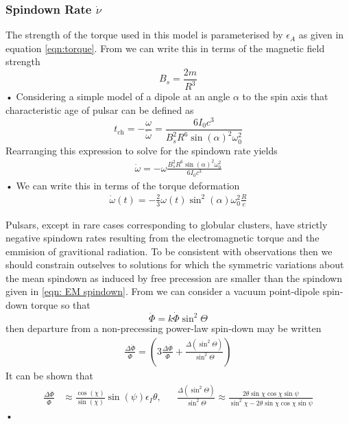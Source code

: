 \documentclass[/home/greg/Thesis/main/main.tex]{subfiles}
\begin{document}
\FloatBarrier
\subsubsection{Spindown Rate $\dot{\nu}$}
The strength of the torque used in this model is parameterised by $\epsilon_{A}$ as given
in equation \eqref{eqn:torque}. From \citet{Shapiro83} we can write this in terms of the
magnetic field strength 
\begin{equation}
B_{s} = \frac{2m}{R^{3}}
\end{equation}•
Considering a simple model of a dipole at an angle $\alpha$ to the spin axis that characteristic
age of pulsar can be defined as
\begin{equation}
t_{\textrm{ch}} = -\frac{\omega}{\dot{\omega}} = \frac{6 I_{0} c^{3}}{B_{s}^{2}R^{6} \sin(\alpha)^{2}\omega_{0}^{2}}
\end{equation}
Rearranging this expression to solve for the spindown rate yields
\begin{align}
\dot\omega = - \omega \frac{B_{s}^{2}R^{6} \sin(\alpha)^{2}\omega_{0}^{2}}{6I_{0}c^{3}}
\end{align}•
We can write this in terms of the torque deformation
\begin{align}
\dot\omega(t) = - \frac{2}{3}\omega(t) \sin^{2}(\alpha) \omega_{0}^{2} \frac{R}{c}
\label{eqn: EM spindown}
\end{align}

Pulsars, except in rare cases corresponding to globular clusters, have strictly 
negative spindown rates resulting from the electromagnetic torque and 
the emmision of gravitional radiation. To be consistent with observations then
we should constrain outselves to solutions for which the symmetric variations
about the mean spindown as induced by free precession are smaller than the 
spindown given in \eqref{eqn: EM spindown}. From \citet{Jones2001} we can
consider a vacuum point-dipole spin-down torque so that
\begin{equation}
\ddot{\Phi} = k \dot{\Phi} \sin^{2}\Theta
\end{equation}
then departure from a non-precessing power-law spin-down may be written
\begin{align}
\frac{\Delta\ddot{\Phi}}{\ddot{\Phi}} = \left(3 \frac{\Delta\dot{\Phi}}{\dot{\Phi}} + \frac{\Delta(\sin^{2}\Theta)}{\sin^{2}\Theta}\right)
\end{align}
It can be shown that 
\begin{align}
\frac{\Delta\dot{\Phi}}{\dot{\Phi}} & \approx \frac{\cos(\chi)}{\sin(\chi)}\sin(\psi) \epsilon_{I}\theta, &&
\frac{\Delta(\sin^{2}\Theta)}{\sin^{2}\Theta} \approx \frac{2\theta\sin\chi\cos\chi\sin\psi}{\sin^{2}\chi - 2\theta\sin\chi\cos\chi\sin\psi}
\end{align}•
\end{document}
